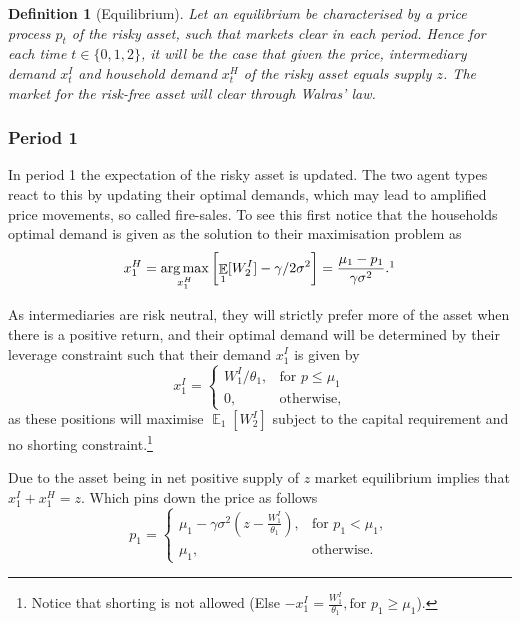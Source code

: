 \documentclass[11pt]{article}
\DeclareMathOperator{\E}{\mathbb{E}} %
\newtheorem{definition}{Definition}%
\DeclareMathOperator*{\argmax}{arg\,max} %
\begin{document}
\begin{definition}[Equilibrium] \label{d_eqm}
Let an equilibrium be characterised by a price process $p_t$ of the risky asset, such that markets clear in each period. Hence for each time $t\in\{0,1,2\}$, it will be the case that given the price, intermediary demand $x^I_t$ and household demand $x^H_t$ of the risky asset equals supply $z$. The market for the risk-free asset will clear through Walras' law.
\end{definition}

\subsubsection*{Period 1}
In period 1 the expectation of the risky asset is updated. The two agent types react to this by updating their optimal demands, which may lead to amplified price movements, so called fire-sales. To see this first notice that the households optimal demand is given as the solution to their maximisation problem as
\begin{equation} \label{e_xH}
x^{H}_1 = \argmax_{x^H_1}\left[\E_1[W^I_2] - \gamma/2\sigma^2\right]
= \frac{\mu_1 - p_1}{\gamma\sigma^2}.\footnotemark
\end{equation}

As intermediaries are risk neutral, they will strictly prefer more of the asset when there is a positive return, and their optimal demand will be determined by their leverage constraint such that their demand $x^I_1$ is given by
\begin{equation}  \label{e_xI}
x^I_1 = \begin{cases}
 W^I_1/\theta_1, &\text{for $p \leq \mu_1$}\\
 0, &\text{otherwise,}
\end{cases}
\end{equation}
\noindent as these positions will maximise $\E_1[W^I_2]$ subject to the capital requirement and no shorting constraint.\footnote{Notice that shorting is not allowed (Else $-x^I_1 = \frac{W^I_1}{\theta_1}, \text{for } p_1 \geq \mu_1$).}


Due to the asset being in net positive supply of $z$ market equilibrium implies that $x^I_1 + x^H_1 = z$. Which pins down the price as follows
\begin{equation}
p_1 = \begin{cases}
\mu_1 - \gamma\sigma^2 \left(z-\frac{W^I_1}{\theta_1}\right), &\text{for } p_1 < \mu_1,\\
\mu_1, &\text{otherwise.}
\end{cases}
\end{equation}
\end{document}

